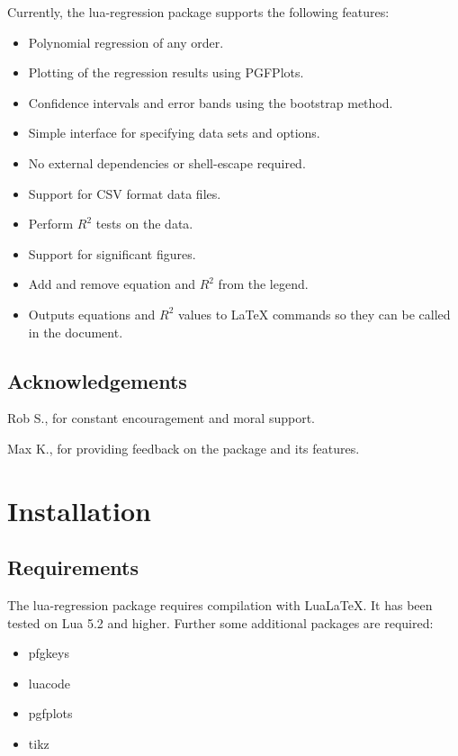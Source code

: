 \documentclass[11pt]{article}
\begin{document}
    Currently, the {\ttfamily lua-regression} package supports the following features:
    \begin{itemize}
        \item Polynomial regression of any order.
        \item Plotting of the regression results using PGFPlots.
        \item Confidence intervals and error bands using the bootstrap method.
        \item Simple interface for specifying data sets and options.
        \item No external dependencies or {\ttfamily shell-escape} required.
        \item Support for CSV format data files.
        \item Perform $R^2$ tests on the data.
        \item Support for significant figures.
        \item Add and remove equation and $R^2$ from the legend.
        \item Outputs equations and $R^2$ values to LaTeX commands so they can be called in the document.
    \end{itemize}

    \subsection{Acknowledgements}

    Rob S., for constant encouragement and moral support.

    Max K., for providing feedback on the package and its features.

    \section{Installation}

    \subsection{Requirements}
    
    The {\ttfamily lua-regression} package requires compilation with Lua\LaTeX. It has been tested on Lua 5.2 and higher.
    Further some additional packages are required:

    \begin{multicols}{4}
        {\ttfamily
            \begin{itemize}
                \item pfgkeys
                \item luacode
                \item pgfplots
                \item tikz
            \end{itemize}
        }
    \end{multicols}
\end{document}

